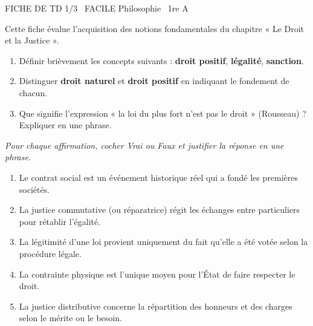 \documentclass[11pt]{article}
\begin{document}
\begin{tcolorbox}[enhanced,colback=popink,colframe=popink,arc=10pt,boxrule=0pt,left=12pt,right=12pt,top=9pt,bottom=9pt]
{\color{white}\popxbold\small FICHE DE TD 1/3 \textbullet\ FACILE \hfill Philosophie \textbullet\ 1re A\par}
\end{tcolorbox}
\vspace{4pt}
Cette fiche évalue l'acquisition des notions fondamentales du chapitre « Le Droit et la Justice ».

\begin{exercice}
\begin{enumerate}
    \item Définir brièvement les concepts suivants : \textbf{droit positif}, \textbf{légalité}, \textbf{sanction}.
    \item Distinguer \textbf{droit naturel} et \textbf{droit positif} en indiquant le fondement de chacun.
    \item Que signifie l'expression « la loi du plus fort n'est pas le droit » (Rousseau) ? Expliquer en une phrase.
\end{enumerate}
\end{exercice}

\begin{exercice}
\emph{Pour chaque affirmation, cocher Vrai ou Faux et justifier la réponse en une phrase.}
\begin{enumerate}
    \item Le contrat social est un événement historique réel qui a fondé les premières sociétés.
    \item La justice commutative (ou réparatrice) régit les échanges entre particuliers pour rétablir l'égalité.
    \item La légitimité d'une loi provient uniquement du fait qu'elle a été votée selon la procédure légale.
    \item La contrainte physique est l'unique moyen pour l'État de faire respecter le droit.
    \item La justice distributive concerne la répartition des honneurs et des charges selon le mérite ou le besoin.
\end{enumerate}
\end{exercice}
\end{document}
